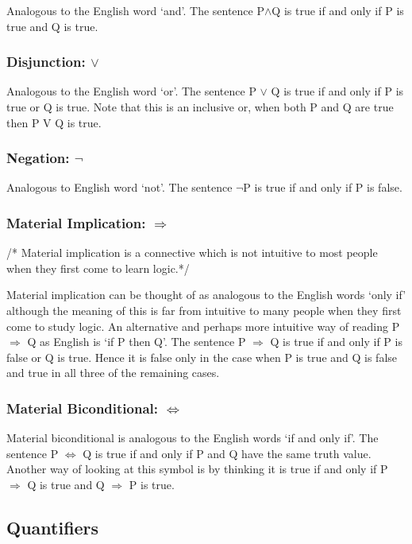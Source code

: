 Analogous to the English word `and'. The sentence P$ \land $Q is true if and only if P is true and Q is true.

\subsubsection*{Disjunction: $\lor$}

Analogous to the English word `or'. The sentence P $\lor$ Q is true if and only if P is true or Q is true. Note that this is an inclusive or, when both P and Q are true then P V Q is true.

\subsubsection*{Negation: $\lnot$}

Analogous to English word `not'. The sentence $\lnot $P is true if and only if P is false.

\subsubsection*{Material Implication: $\Rightarrow$}

/* Material implication is a connective which is not intuitive to most people when they first come to learn logic.*/

Material implication can be thought of as analogous to the English words `only if' although the meaning of this is far from intuitive to many people when they first come to study logic. An alternative and perhaps more intuitive way of reading P $\Rightarrow $ Q as English is `if P then Q'. The sentence P $ \Rightarrow $ Q is true if and only if P is false or Q is true. Hence it is false only in the case when P is true and Q is false and true in all three of the remaining cases.

\subsubsection*{Material Biconditional: $\Leftrightarrow$}

Material biconditional is analogous to the English words `if and only if'. The sentence P $\Leftrightarrow$ Q is true if and only if P and Q have the same truth value. Another way of looking at this symbol is by thinking it is true if and only if P $\Rightarrow$ Q is true and Q $\Rightarrow $ P is true.

\subsection*{Quantifiers}

